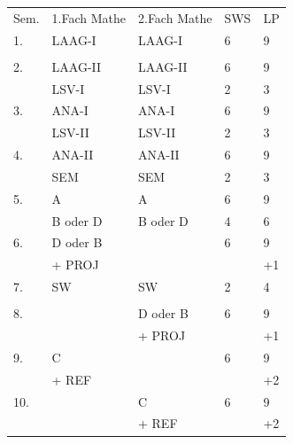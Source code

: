 \begin{center}
\begin{tabular}{|p{13mm}|p{40mm}||p{40mm}|p{40mm}|p{40mm}|}
\hline 				Sem. & 1.Fach Mathe & 2.Fach Mathe & SWS & LP \\
\hhline{|=|=|=|=|=|} 1.  & LAAG-I 	  & LAAG-I  	  & 6   & 9  \\
                         &            &              &     &    \\
\hline				 2.	 & LAAG-II	  & LAAG-II	 	  & 6	  & 9  \\
						       & LSV-I		  & LSV-I	     & 2	  & 3  \\
\hline				 3.	 & ANA-I		  & ANA-I	 	  & 6	  & 9  \\
						       & LSV-II     & LSV-II	     & 2   & 3  \\
\hline				 4.	 & ANA-II	  & ANA-II 	     & 6	  & 9  \\
						       & SEM  		  & SEM			  & 2	  & 3  \\
\hline				 5.	 & A		     & A	           & 6	  & 9  \\
						       & B oder D	  & B oder D	  & 4	  & 6  \\
\hline				 6.	 & D oder B	  & 	           & 6	  & 9  \\
						       & + PROJ	  & 	 	        & 	  & +1 \\
\hhline{|=|=|=|=|=|} 7.  & SW			  & SW 			  & 2	  & 4  \\
						       & 			  & 			     & 	  &    \\
\hline 				 8.    & 			  & D oder B 	  & 6	  & 9  \\
						       & 			  & + PROJ 		  & 	  & +1 \\
\hline				 9.    & C			  &              & 6	  & 9  \\
						       & + REF		  &    	        & 	  & +2 \\
\hline				 10.   & 			  & C 		     & 6   & 9  \\
                         &            & + REF        &     & +2 \\
\hline
\end{tabular}

\end{center}
\clearpage

